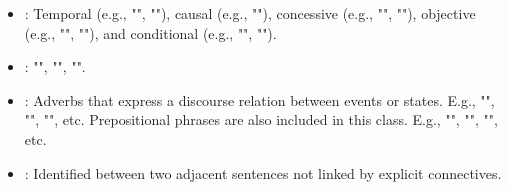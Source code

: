 \documentclass{KBook}
\begin{document}
\begin{itemize}
	\item {}: Temporal (e.g., "", ""), causal (e.g., ""), concessive (e.g., "", ""), objective (e.g., "", ""), and conditional (e.g., "", "").
	
	\item {}: "", "", "".
	
	\item {}: Adverbs that express a discourse relation between events or states. E.g., "", "", "", etc. Prepositional phrases are also included in this class. E.g., "", "", "", etc.
	
	\item {}: Identified between two adjacent sentences not linked by explicit connectives.
\end{itemize}
\end{document}

